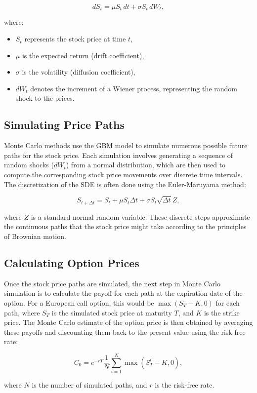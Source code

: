 \documentclass{article}
\begin{document}
\[ dS_t = \mu S_t \, dt + \sigma S_t \, dW_t, \]

where:
\begin{itemize}
    \item \( S_t \) represents the stock price at time \( t \),
    \item \( \mu \) is the expected return (drift coefficient),
    \item \( \sigma \) is the volatility (diffusion coefficient),
    \item \( dW_t \) denotes the increment of a Wiener process, representing the random shock to the prices.
\end{itemize}

\subsection{Simulating Price Paths}
Monte Carlo methods use the GBM model to simulate numerous possible future paths for the stock price. Each simulation involves generating a sequence of random shocks (\( dW_t \)) from a normal distribution, which are then used to compute the corresponding stock price movements over discrete time intervals. The discretization of the SDE is often done using the Euler-Maruyama method:

\[ S_{t+\Delta t} = S_t + \mu S_t \Delta t + \sigma S_t \sqrt{\Delta t} Z, \]

where \( Z \) is a standard normal random variable. These discrete steps approximate the continuous paths that the stock price might take according to the principles of Brownian motion.

\subsection{Calculating Option Prices}
Once the stock price paths are simulated, the next step in Monte Carlo simulation is to calculate the payoff for each path at the expiration date of the option. For a European call option, this would be \( \max(S_T - K, 0) \) for each path, where \( S_T \) is the simulated stock price at maturity \( T \), and \( K \) is the strike price. The Monte Carlo estimate of the option price is then obtained by averaging these payoffs and discounting them back to the present value using the risk-free rate:

\[ C_0 = e^{-rT} \frac{1}{N} \sum_{i=1}^N \max(S_T^i - K, 0), \]

where \( N \) is the number of simulated paths, and \( r \) is the risk-free rate.
\end{document}
